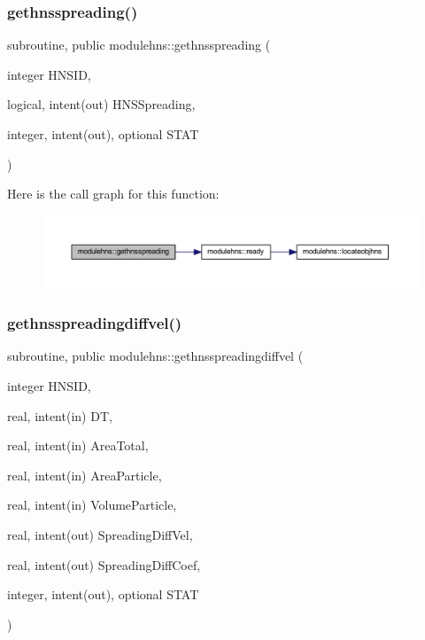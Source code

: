 \subsubsection{\texorpdfstring{gethnsspreading()}{gethnsspreading()}}
{\footnotesize\ttfamily subroutine, public modulehns\+::gethnsspreading (\begin{DoxyParamCaption}\item[{integer}]{H\+N\+S\+ID,  }\item[{logical, intent(out)}]{H\+N\+S\+Spreading,  }\item[{integer, intent(out), optional}]{S\+T\+AT }\end{DoxyParamCaption})}

Here is the call graph for this function\+:\nopagebreak
\begin{figure}[H]
\begin{center}
\leavevmode
\includegraphics[width=350pt]{namespacemodulehns_a348f38143e5b2cd8130f996bf16a44a2_cgraph}
\end{center}
\end{figure}
\mbox{\label{namespacemodulehns_a13a7fa3be67224e60db06a75d7f0dea7}} 
\subsubsection{\texorpdfstring{gethnsspreadingdiffvel()}{gethnsspreadingdiffvel()}}
{\footnotesize\ttfamily subroutine, public modulehns\+::gethnsspreadingdiffvel (\begin{DoxyParamCaption}\item[{integer}]{H\+N\+S\+ID,  }\item[{real, intent(in)}]{DT,  }\item[{real, intent(in)}]{Area\+Total,  }\item[{real, intent(in)}]{Area\+Particle,  }\item[{real, intent(in)}]{Volume\+Particle,  }\item[{real, intent(out)}]{Spreading\+Diff\+Vel,  }\item[{real, intent(out)}]{Spreading\+Diff\+Coef,  }\item[{integer, intent(out), optional}]{S\+T\+AT }\end{DoxyParamCaption})}

